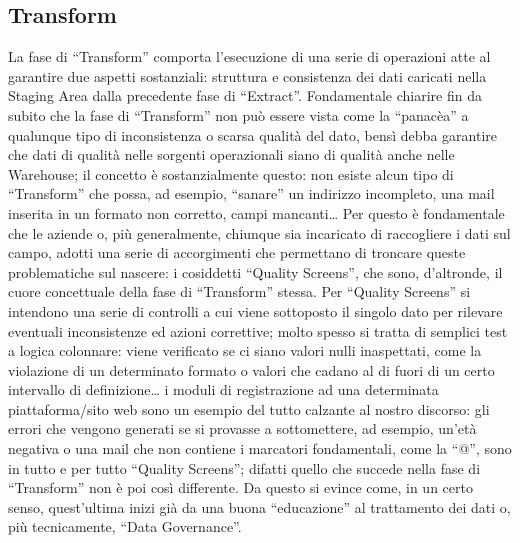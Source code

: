 \documentclass[a4paper,12pt]{report}
\begin{document}
\subsection{Transform}
La fase di “Transform” comporta l’esecuzione di una serie di operazioni atte al garantire due aspetti sostanziali: struttura e consistenza dei dati caricati nella Staging Area dalla precedente fase di “Extract”. Fondamentale chiarire fin da subito che la fase di “Transform” non può essere vista come la “panacèa” a qualunque tipo di inconsistenza o scarsa qualità del dato, bensì debba garantire che dati di qualità nelle sorgenti operazionali siano di qualità anche nelle Warehouse; il concetto è sostanzialmente questo: non esiste alcun tipo di “Transform” che possa, ad esempio, “sanare” un indirizzo incompleto, una mail inserita in un formato non corretto, campi mancanti… Per questo è fondamentale che le aziende o, più generalmente, chiunque sia incaricato di raccogliere i dati sul campo, adotti una serie di accorgimenti che permettano di troncare queste problematiche sul nascere: i cosiddetti “Quality Screens”, che sono, d’altronde, il cuore concettuale della fase di “Transform” stessa. Per “Quality Screens” si intendono una serie di controlli a cui viene sottoposto il singolo dato per rilevare eventuali inconsistenze ed azioni correttive; molto spesso si tratta di semplici test a logica colonnare: viene verificato se ci siano valori nulli inaspettati, come la violazione di un determinato formato o valori che cadano al di fuori di un certo intervallo di definizione… i moduli di registrazione ad una determinata piattaforma/sito web sono un esempio del tutto calzante al nostro discorso: gli errori che vengono generati se si provasse a sottomettere, ad esempio, un’età negativa o una mail che non contiene i marcatori fondamentali, come la “@”, sono in tutto e per tutto “Quality Screens”; difatti quello che succede nella fase di “Transform” non è poi così differente. Da questo si evince come, in un certo senso, quest’ultima inizi già da una buona “educazione” al trattamento dei dati o, più tecnicamente, “Data Governance”.
\end{document}
